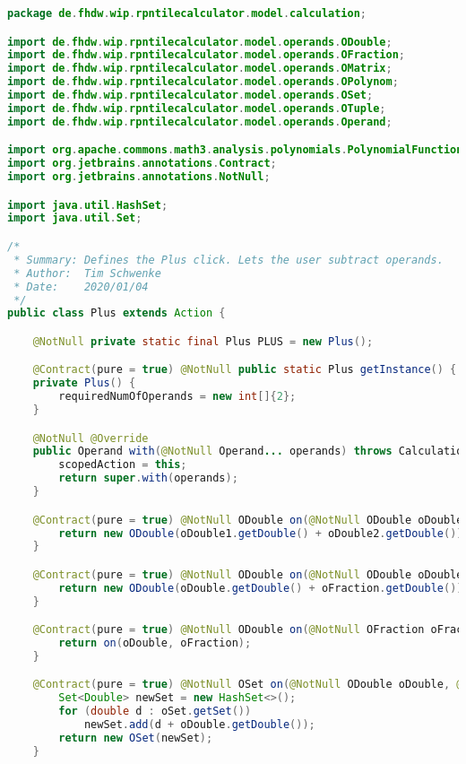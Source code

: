 \begin{lstlisting}[caption=Plus (Schwenke),label=list:Plus,language=Java]
package de.fhdw.wip.rpntilecalculator.model.calculation;

import de.fhdw.wip.rpntilecalculator.model.operands.ODouble;
import de.fhdw.wip.rpntilecalculator.model.operands.OFraction;
import de.fhdw.wip.rpntilecalculator.model.operands.OMatrix;
import de.fhdw.wip.rpntilecalculator.model.operands.OPolynom;
import de.fhdw.wip.rpntilecalculator.model.operands.OSet;
import de.fhdw.wip.rpntilecalculator.model.operands.OTuple;
import de.fhdw.wip.rpntilecalculator.model.operands.Operand;

import org.apache.commons.math3.analysis.polynomials.PolynomialFunction;
import org.jetbrains.annotations.Contract;
import org.jetbrains.annotations.NotNull;

import java.util.HashSet;
import java.util.Set;

/*
 * Summary: Defines the Plus click. Lets the user subtract operands.
 * Author:  Tim Schwenke
 * Date:    2020/01/04
 */
public class Plus extends Action {

    @NotNull private static final Plus PLUS = new Plus();

    @Contract(pure = true) @NotNull public static Plus getInstance() { return PLUS; }
    private Plus() {
        requiredNumOfOperands = new int[]{2};
    }

    @NotNull @Override
    public Operand with(@NotNull Operand... operands) throws CalculationException {
        scopedAction = this;
        return super.with(operands);
    }

    @Contract(pure = true) @NotNull ODouble on(@NotNull ODouble oDouble1, @NotNull ODouble oDouble2) {
        return new ODouble(oDouble1.getDouble() + oDouble2.getDouble());
    }

    @Contract(pure = true) @NotNull ODouble on(@NotNull ODouble oDouble, @NotNull OFraction oFraction) {
        return new ODouble(oDouble.getDouble() + oFraction.getDouble());
    }

    @Contract(pure = true) @NotNull ODouble on(@NotNull OFraction oFraction, @NotNull ODouble oDouble) {
        return on(oDouble, oFraction);
    }

    @Contract(pure = true) @NotNull OSet on(@NotNull ODouble oDouble, @NotNull OSet oSet) {
        Set<Double> newSet = new HashSet<>();
        for (double d : oSet.getSet())
            newSet.add(d + oDouble.getDouble());
        return new OSet(newSet);
    }


\end{lstlisting}
